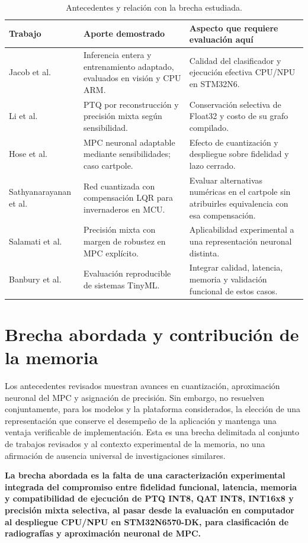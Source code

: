 \begin{table}[htbp]\centering\footnotesize
\caption{Antecedentes y relación con la brecha estudiada.}\label{tab:estado}
\begin{tabularx}{\linewidth}{p{2.4cm}YY}\toprule
Trabajo & Aporte demostrado & Aspecto que requiere evaluación aquí\\\midrule
Jacob et al. \cite{jacob2018} & Inferencia entera y entrenamiento adaptado, evaluados en visión y CPU ARM. & Calidad del clasificador y ejecución efectiva CPU/NPU en STM32N6.\\
Li et al. \cite{brecq2021} & PTQ por reconstrucción y precisión mixta según sensibilidad. & Conservación selectiva de Float32 y costo de su grafo compilado.\\
Hose et al. \cite{hose2024} & MPC neuronal adaptable mediante sensibilidades; caso cartpole. & Efecto de cuantización y despliegue sobre fidelidad y lazo cerrado.\\
Sathyanarayanan et al. \cite{greenhouse2024} & Red cuantizada con compensación LQR para invernaderos en MCU. & Evaluar alternativas numéricas en el cartpole sin atribuirles equivalencia con esa compensación.\\
Salamati et al. \cite{salamati2019} & Precisión mixta con margen de robustez en MPC explícito. & Aplicabilidad experimental a una representación neuronal distinta.\\
Banbury et al. \cite{banbury2021} & Evaluación reproducible de sistemas TinyML. & Integrar calidad, latencia, memoria y validación funcional de estos casos.\\\bottomrule
\end{tabularx}
\end{table}
\FloatBarrier

\section{Brecha abordada y contribución de la memoria}
Los antecedentes revisados muestran avances en cuantización, aproximación neuronal del MPC y asignación de precisión. Sin embargo, no resuelven conjuntamente, para los modelos y la plataforma considerados, la elección de una representación que conserve el desempeño de la aplicación y mantenga una ventaja verificable de implementación. Esta es una brecha delimitada al conjunto de trabajos revisados y al contexto experimental de la memoria, no una afirmación de ausencia universal de investigaciones similares.

\textbf{La brecha abordada es la falta de una caracterización experimental integrada del compromiso entre fidelidad funcional, latencia, memoria y compatibilidad de ejecución de PTQ INT8, QAT INT8, INT16x8 y precisión mixta selectiva, al pasar desde la evaluación en computador al despliegue CPU/NPU en STM32N6570-DK, para clasificación de radiografías y aproximación neuronal de MPC.}

